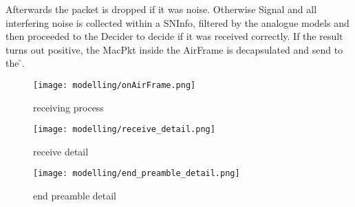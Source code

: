 Afterwards the packet is dropped if it was noise. Otherwise Signal and all interfering noise is collected within a SNInfo, filtered by the analogue models and then proceeded to the Decider to decide if it was received correctly. If the result turns out positive, the MacPkt inside the AirFrame is decapsulated and send to the \h{\baseMacLayer}.

\begin{figure}[H]
 \centering
 \texttt{[image: modelling/onAirFrame.png]}
 \caption{receiving process}
 \label{fig: receiving process}
\end{figure}

\begin{figure}[H]
 \centering
 \texttt{[image: modelling/receive\_detail.png]}
 \caption{receive detail}
 \label{fig: receive detail}
\end{figure}

\begin{figure}[H]
 \centering
 \texttt{[image: modelling/end\_preamble\_detail.png]}
 \caption{end preamble detail}
 \label{fig: end preamble detail}
\end{figure}

\newpage







